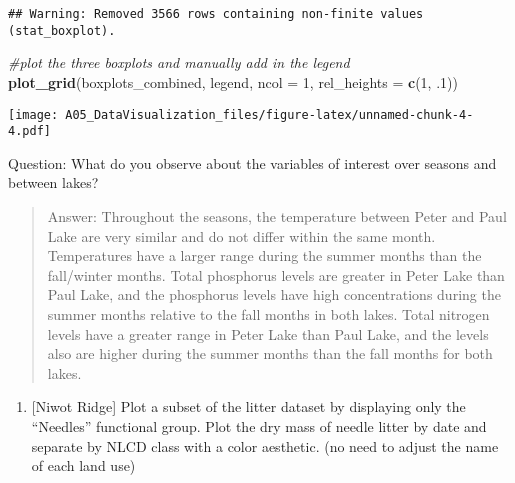 \documentclass[]{article}
\newenvironment{Shaded}{\begin{snugshade}}{\end{snugshade}}
\newcommand{\CommentTok}[1]{\textcolor[rgb]{0.56,0.35,0.01}{\textit{#1}}}
\newcommand{\DataTypeTok}[1]{\textcolor[rgb]{0.13,0.29,0.53}{#1}}
\newcommand{\DecValTok}[1]{\textcolor[rgb]{0.00,0.00,0.81}{#1}}
\newcommand{\FloatTok}[1]{\textcolor[rgb]{0.00,0.00,0.81}{#1}}
\newcommand{\KeywordTok}[1]{\textcolor[rgb]{0.13,0.29,0.53}{\textbf{#1}}}
\newcommand{\NormalTok}[1]{#1}
\providecommand{\tightlist}{%
  \setlength{\itemsep}{0pt}\setlength{\parskip}{0pt}}
\begin{document}
\begin{verbatim}
## Warning: Removed 3566 rows containing non-finite values (stat_boxplot).
\end{verbatim}

\begin{Shaded}
\begin{Highlighting}[]
\CommentTok{#plot the three boxplots and manually add in the legend }
\KeywordTok{plot_grid}\NormalTok{(boxplots_combined, legend, }\DataTypeTok{ncol =} \DecValTok{1}\NormalTok{, }\DataTypeTok{rel_heights =} \KeywordTok{c}\NormalTok{(}\DecValTok{1}\NormalTok{, }\FloatTok{.1}\NormalTok{)) }
\end{Highlighting}
\end{Shaded}

\texttt{[image: A05\_DataVisualization\_files/figure-latex/unnamed-chunk-4-4.pdf]}

Question: What do you observe about the variables of interest over
seasons and between lakes?

\begin{quote}
Answer: Throughout the seasons, the temperature between Peter and Paul
Lake are very similar and do not differ within the same month.
Temperatures have a larger range during the summer months than the
fall/winter months. Total phosphorus levels are greater in Peter Lake
than Paul Lake, and the phosphorus levels have high concentrations
during the summer months relative to the fall months in both lakes.
Total nitrogen levels have a greater range in Peter Lake than Paul Lake,
and the levels also are higher during the summer months than the fall
months for both lakes.
\end{quote}

\begin{enumerate}
\def\labelenumi{\arabic{enumi}.}
\setcounter{enumi}{5}
\tightlist
\item
  {[}Niwot Ridge{]} Plot a subset of the litter dataset by displaying
  only the ``Needles'' functional group. Plot the dry mass of needle
  litter by date and separate by NLCD class with a color aesthetic. (no
  need to adjust the name of each land use)
\end{enumerate}
\end{document}
